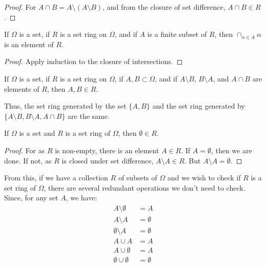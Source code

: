 \documentclass[crop=false,class=book,oneside]{standalone}
\begin{document}
            \begin{proof}
                For $A\cap{B}=A\setminus(A\setminus{B})$, and
                from the closure of set difference,
                $A\cap{B}\in{R}$.
            \end{proof}
            \begin{theorem}
                If $\Omega$ is a set, if $R$ is a set ring
                on $\Omega$, and if $A$ is a finite subset of
                $R$, then $\cap_{\alpha\in{A}}\alpha$ is an
                element of $R$.
            \end{theorem}
            \begin{proof}
                Apply induction to the closure of intersections.
            \end{proof}
            \begin{theorem}
                If $\Omega$ is a set, if $R$ is a set ring on
                $\Omega$, if $A,B\subset\Omega$, and if
                $A\setminus{B}$, $B\setminus{A}$, and
                $A\cap{B}$ are elements of $R$, then
                $A,B\in{R}$.
            \end{theorem}
            Thus, the set ring generated by the set $\{A,B\}$ and
            the set ring generated by
            $\{A\setminus{B},B\setminus{A},A\cap{B}\}$ are the
            same.
            \begin{theorem}
                If $\Omega$ is a set and $R$ is a set ring
                of $\Omega$, then $\emptyset\in{R}$.
            \end{theorem}
            \begin{proof}
                For as $R$ is non-empty, there is an element
                $A\in{R}$. If $A=\emptyset$, then we are done.
                If not, as $R$ is closed under set difference,
                $A\setminus{A}\in{R}$. But
                $A\setminus{A}=\emptyset$.
            \end{proof}
            From this, if we have a collection $R$ of subsets of
            $\Omega$ and we wish to check if $R$ is a set ring
            of $\Omega$, there are several redundant operations
            we don't need to check. Since, for any set $A$,
            we have:
            \begin{align}
                A\setminus\emptyset&=A\\
                A\setminus{A}&=\emptyset\\
                \emptyset\setminus{A}&=\emptyset\\
                A\cup{A}&=A\\
                A\cup\emptyset&=A\\
                \emptyset\cup\emptyset&=\emptyset
            \end{align}
\end{document}
